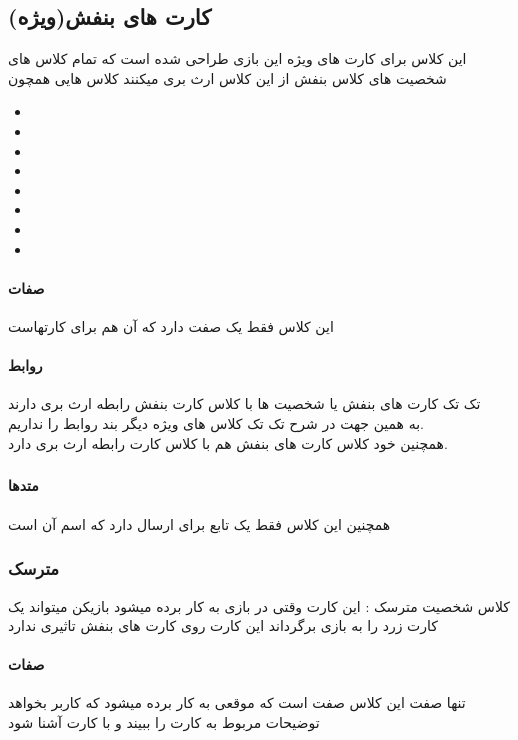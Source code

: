\documentclass[pdf,titlepage,a4paper]{report}
\begin{document}
	
	\subsection{کارت های بنفش(ویژه)}
	این کلاس برای کارت های ویژه این بازی طراحی شده است که تمام کلاس های شخصیت های کلاس بنفش از این کلاس ارث بری میکنند
	کلاس هایی همچون 
	\begin{itemize}
		\item {}
		\item {}
		\item {}
		\item {}
		\item {}
		\item {}
		\item {}
		\item {}  
	\end{itemize}
	\paragraph{صفات}
	این کلاس فقط یک صفت دارد که آن هم برای   کارتهاست
	\paragraph{روابط}
	تک تک کارت های بنفش یا شخصیت ها با کلاس کارت بنفش رابطه ارث بری دارند \\
	به همین جهت در شرح تک تک کلاس های ویژه دیگر بند روابط را نداریم.\\
	همچنین خود کلاس کارت های بنفش هم با کلاس کارت رابطه ارث بری دارد.\\

	\subparagraph{}
	
	\paragraph{متدها}
	همچنین این کلاس فقط یک تابع برای ارسال  دارد که اسم آن  است
	\subsubsection{مترسک}
	کلاس شخصیت مترسک : این کارت وقتی در بازی به کار برده میشود بازیکن میتواند یک کارت زرد را به بازی برگرداند 
	این کارت روی کارت های بنفش تاثیری ندارد
	\paragraph{صفات}
	 تنها  صفت این کلاس صفت   است که موقعی به کار برده میشود که کاربر بخواهد توضیحات مربوط به کارت را ببیند و با کارت آشنا شود
	 
\end{document}
